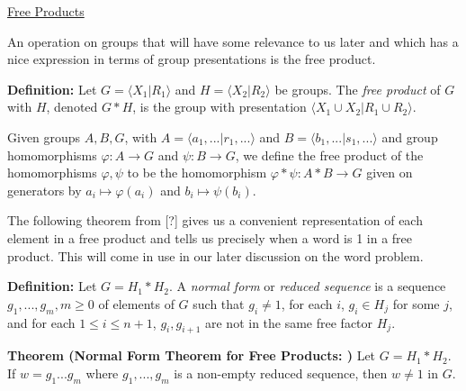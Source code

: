 \documentclass[12pt]{article}
\newcommand{\vs}{\vskip10pt}
\begin{document}
	\vs 
	
	\underline{Free Products}
	
	\vs
	
	An operation on groups that will have some relevance to us later and which has a nice expression in terms of group presentations is the free product. 
	
	\vs 
	
	\textbf{Definition: } Let $G = \langle X_1 \vert R_1 \rangle$ and $H = \langle X_2 \vert R_2 \rangle$ be groups. The \textit{free product} of $G$ with $H$, denoted $G*H$, is the group with presentation $\langle X_1 \cup X_2 \vert R_1 \cup R_2 \rangle$. 
	
	\vs 
	
	Given groups $A,B,G$, with $A = \langle a_1,... \vert r_1,... \rangle$ and $B = \langle b_1,... \vert s_1,... \rangle$ and group homomorphisms $\varphi: A \rightarrow G$ and $\psi: B \rightarrow G$, we define the free product of the homomorphisms $\varphi, \psi$ to be the homomorphism $\varphi * \psi: A * B \rightarrow G$ given on generators by $a_i \mapsto \varphi(a_i)$ and $b_i \mapsto \psi(b_i)$. 
	
	\vs 
	
	The following theorem from [?] gives us a convenient representation of each element in a free product and tells us precisely when a word is 1 in a free product. This will come in use in our later discussion on the word problem. 
	
	\vs 
	
	\textbf{Definition: } Let $G = H_1 * H_2$. A \textit{normal form} or \textit{reduced sequence} is a sequence $g_1,...,g_m, m \geq 0$ of elements of $G$ such that $g_i \neq 1$, for each $i$, $g_i \in H_j$ for some $j$, and for each $1 \leq i \leq n+1$, $g_i, g_{i+1}$ are not in the same free factor $H_j$. 
	
	\vs
	
	\textbf{Theorem (Normal Form Theorem for Free Products: )} Let $G = H_1 * H_2$. If $w = g_1...g_m$ where $g_1,...,g_m$ is a non-empty reduced sequence, then $w \neq 1$ in $G$. 
	
\end{document}
